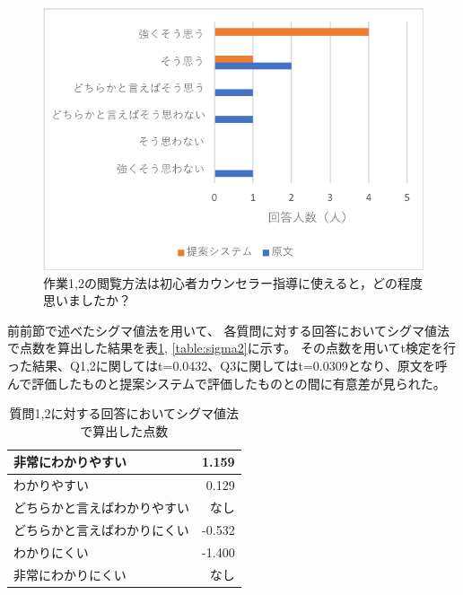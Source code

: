 \documentclass[shuuron]{kuee}
\begin{document}
\begin{figure}
  \begin{center}
    \includegraphics[width=\linewidth]{q3.png}
  \end{center}
  \caption{作業1,2の閲覧方法は初心者カウンセラー指導に使えると，どの程度思いましたか？}
  \label{fig:q3}
\end{figure}

前前節で述べたシグマ値法を用いて、
各質問に対する回答においてシグマ値法で点数を算出した結果を表\ref{table:sigma}, \ref{table:sigma2}に示す。
その点数を用いてt検定を行った結果、Q1,2に関してはt=0.0432、Q3に関してはt=0.0309となり、原文を呼んで評価したものと提案システムで評価したものとの間に有意差が見られた。

\begin{table}
  \caption{質問1,2に対する回答においてシグマ値法で算出した点数}
  \label{table:sigma}
  \begin{center}
    \begin{tabular}{|l|r|} \hline
      非常にわかりやすい & 1.159 \\ \hline
      わかりやすい  & 0.129 \\ \hline
      どちらかと言えばわかりやすい & なし \\ \hline
      どちらかと言えばわかりにくい & -0.532 \\ \hline
      わかりにくい  & -1.400 \\ \hline
      非常にわかりにくい & なし \\ \hline
    \end{tabular}
  \end{center}
\end{table}
\end{document}
